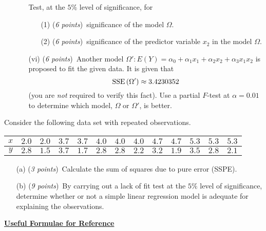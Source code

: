 \documentclass[12pt]{article}
\begin{document}
\begin{enumerate}
\begin{enumerate}
Test, at the $5\%$ level of significance, for
\begin{enumerate}
\item[(1)]
({\em 6 points\/})~significance of the model $\Omega$.
\item[(2)]
({\em 6 points\/})~significance of the predictor variable $x_2$ in the model $\Omega$.
\end{enumerate}
\item[(vi)]
({\em 6 points\/})~Another model $\Omega' : E\left(Y\right) = \alpha_0 + \alpha_1 x_{1} + \alpha_2 x_{2} + \alpha_3 x_1 x_2$ is proposed to fit the given data. It is given that
$$
{\rm SSE}\left(\Omega'\right) \approx 3.4230352
$$
(you are {\em not\/} required to verify this fact). Use a partial $F$-test at $\alpha = 0.01$ to determine which model, $\Omega$ or $\Omega'$, is better.
\end{enumerate}
\end{enumerate}

\newpage


\vspace{0.35cm}

\noindent Consider the following data set with repeated observations.

\begin{center}
\begin{tabular}{|c||cc|cc|ccc|cc|ccc|} \hline
$x$ & $2.0$ & $2.0$ & $3.7$ & $3.7$ & $4.0$ & $4.0$ & $4.0$ & $4.7$ & $4.7$ & $5.3$ & $5.3$ & $5.3$ \\ \hline
$y$ & $2.8$ & $1.5$ & $3.7$ & $1.7$ & $2.8$ & $2.8$ & $2.2$ & $3.2$ & $1.9$ & $3.5$ & $2.8$ & $2.1$ \\ \hline
\end{tabular}
\end{center}

\begin{enumerate}
\item[(a)]
({\em 3 points\/})~Calculate the sum of squares due to pure error (SSPE).
\item[(b)]
({\em 9 points\/})~By carrying out a lack of fit test at the $5\%$ level of significance, determine whether or not a simple linear regression model is adequate for explaining the observations.
\end{enumerate}


\newpage

\begin{center}
\underline{\bf Useful Formulae for Reference}
\end{center}
\end{document}
